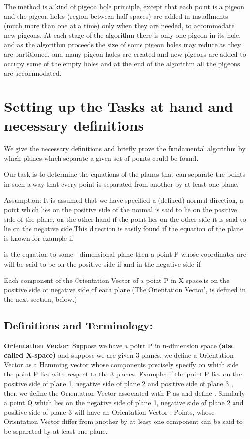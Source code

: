 \documentclass[english]{article}
\begin{document}
The method is a kind of pigeon hole principle, except that each point
is a pigeon and the pigeon holes (region between half spaces) are
added in installments (much more than one at a time) only when they
are needed, to accommodate new pigeons. At each stage of the algorithm
there is only one pigeon in its hole, and as the algorithm proceeds
the size of some pigeon holes may reduce as they are partitioned, and  many pigeon holes are created and new pigeons are added to occupy some of the empty holes and at the end of the algorithm all the pigeons are accommodated.

\section{Setting up the Tasks at hand and necessary definitions}

We give the necessary definitions and briefly prove the fundamental
algorithm by which planes which separate a given set of points could
be found. 

Our task is to determine the equations of the planes that can separate
the points in such a way that every point is separated from another
by at least one plane.

Assumption: It is assumed that we have specified a (defined) normal
direction, a point which lies on the positive side of the normal is
said to lie on the positive side of the plane, on the other hand if
the point lies on the other side it is said to lie on the negative
side.This direction is easily found if the equation of the plane is
known for example if 



is the equation to some - dimensional plane then a point P whose
coordinates are  will be said to be on
the positive side if 
and in the negative side if



Each component of the Orientation Vector of a point P in X space,is on the positive side or negative side of each plane.(The`Orientation Vector', is defined in the next section, below.)

\subsection{Definitions and Terminology: }

\textbf{Orientation Vector}: Suppose we have a point P in n-dimension
space \textbf{(also called X-space)} and suppose we are given 3-planes.
we define a Orientation Vector as a Hamming vector whose components
precisely specify on which side the point P lies with respect to the
3 planes. Example: if the point P lies on the positive side of plane
1, negative side of plane 2 and positive side of plane 3 , then we
define the Orientation Vector associated with P as  and define
. Similarly a point Q which lies on the negative
side of plane 1, negative side of plane 2 and positive side of plane
3 will have an Orientation Vector  . Points,
whose Orientation Vector differ from another by at least one component
can be said to be separated by at least one plane.
\end{document}
